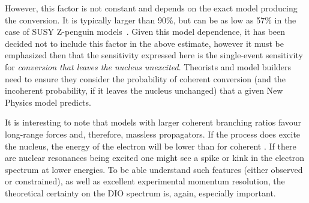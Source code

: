 However, this factor is not constant and depends on the exact model producing the conversion.  
It is typically larger than 90\%, but can be as low as 57\% in the case of SUSY Z-penguin models~\cite{Siiskonen:1999pj}.
Given this model dependence, it has been decided not to include this factor in the above estimate, however it must be emphasized then that the sensitivity expressed here is the single-event sensitivity for \emph{conversion that leaves the nucleus unexcited}.
Theorists and model builders need to ensure they consider the probability of coherent conversion (and the incoherent probability, if it leaves the nucleus unchanged) that a given New Physics model predicts.

It is interesting to note that models with larger coherent branching ratios favour long-range forces and, therefore, massless propagators.
If the process does excite the nucleus, the energy of the electron will be lower than for coherent \mueconv.
If there are nuclear resonances being excited one might see a spike or kink in the electron spectrum at lower energies.
To be able understand such features (either observed or constrained), as well as excellent experimental momentum resolution, the theoretical certainty on the \ac{DIO} spectrum is, again, especially important.
